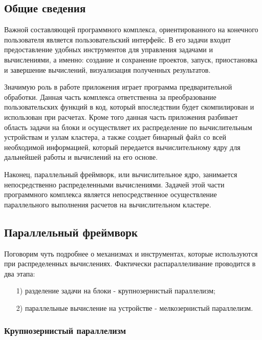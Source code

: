 \documentclass[a4paper, 14pt]{extarticle}
\theoremstyle{definition}
\begin{document}
\subsection{Общие сведения}

\par Важной составляющей программного комплекса, ориентированного на конечного пользователя является пользовательский интерфейс. В его задачи входит предоставление удобных инструментов для управления задачами и вычислениями, а именно: создание и сохранение проектов, запуск, приостановка и завершение вычислений, визуализация полученных результатов.

\par Значимую роль в работе приложения играет программа предварительной обработки. Данная часть комплекса ответственна за преобразование пользовательских функций в код, который впоследствии будет скомпилирован и использован при расчетах. Кроме того данная часть приложения разбивает область задачи на блоки и осуществляет их распределение по вычислительным устройствам и узлам кластера, а также создает бинарный файл со всей необходимой информацией, который передается вычислительному ядру для дальнейшей работы и вычислений на его основе.

\par Наконец, параллельный фреймворк, или вычислительное ядро, занимается непосредственно распределенными вычислениями. Задачей этой части программного комплекса является непосредственное осуществление параллельного выполнения расчетов на вычислительном кластере.



\subsection{Параллельный фреймворк}

\par Поговорим чуть подробнее о механизмах и инструментах, которые используются при распределенных вычислениях. Фактически распараллеливание проводится в два этапа:
\begin{enumerate}
\item[1)] разделение задачи на блоки - крупнозернистый параллелизм;
\item[2)] параллельные вычисление на устройстве - мелкозернистый параллелизм.
\end{enumerate}

\subsubsection{Крупнозернистый параллелизм}
\end{document}
